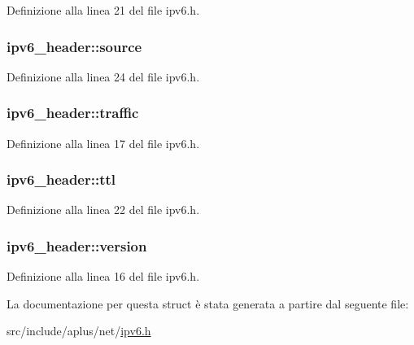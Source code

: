 Definizione alla linea 21 del file ipv6.\+h.

\hypertarget{structipv6__header_a1ad13965e74030de39800b8208b81d50}{
\subsubsection[{source}]{ ipv6\+\_\+header\+::source}}\label{structipv6__header_a1ad13965e74030de39800b8208b81d50}


Definizione alla linea 24 del file ipv6.\+h.

\hypertarget{structipv6__header_a606cd7e1d19fc609e648d88aabcd7b55}{
\subsubsection[{traffic}]{ ipv6\+\_\+header\+::traffic}}\label{structipv6__header_a606cd7e1d19fc609e648d88aabcd7b55}


Definizione alla linea 17 del file ipv6.\+h.

\hypertarget{structipv6__header_a33bb04e114be3a3e1d5dd2c360bc4844}{
\subsubsection[{ttl}]{ ipv6\+\_\+header\+::ttl}}\label{structipv6__header_a33bb04e114be3a3e1d5dd2c360bc4844}


Definizione alla linea 22 del file ipv6.\+h.

\hypertarget{structipv6__header_acf470d4fdf8b7215b3a2b02b0bf030b6}{
\subsubsection[{version}]{ ipv6\+\_\+header\+::version}}\label{structipv6__header_acf470d4fdf8b7215b3a2b02b0bf030b6}


Definizione alla linea 16 del file ipv6.\+h.



La documentazione per questa struct è stata generata a partire dal seguente file\+:\begin{DoxyCompactItemize}
\item 
src/include/aplus/net/\hyperlink{ipv6_8h}{ipv6.\+h}\end{DoxyCompactItemize}
